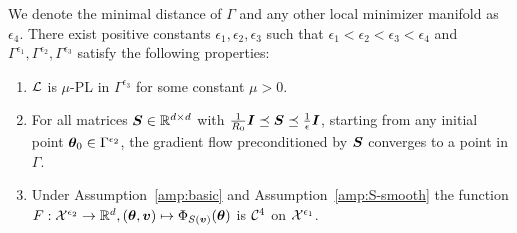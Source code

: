 \begin{lemma}\label{lem:working-zone}
We denote the minimal distance of $\Gamma$ and any other local minimizer manifold as $\epsilon_4$. There exist positive constants $\epsilon_1, \epsilon_2, \epsilon_3$ such that $\epsilon_1 < \epsilon_2 < \epsilon_3 < \epsilon_4$ and $\Gamma^{\epsilon_1}, \Gamma^{\epsilon_2},\Gamma^{\epsilon_3}$ satisfy the following properties: 
\begin{enumerate}
        \item $\mathcal{L}$ is $\mu$-PL in $\Gamma^{\epsilon_3}$ for some constant $\mu > 0$.
        \item For all matrices ${\bm{S}} \in \mathbb{R}^{d \times d}$ with $\frac{1}{R_0}{\bm{I}} \preceq {\bm{S}} \preceq \frac{1}{\epsilon}{\bm{I}}$, 
        starting from any initial point ${\bm{\theta}}_0 \in \Gamma^{\epsilon_2}$, 
        the gradient flow preconditioned by ${\bm{S}}$ converges to a point in $\Gamma$. 
        \item %
        Under Assumption~\ref{amp:basic} and Assumption~\ref{amp:S-smooth}
        the function $F: \mathcal{X}^{\epsilon_2} \to \mathbb{R}^d, ({\bm{\theta}}, {\bm{v}}) \mapsto \Phi_{S({\bm{v}})}({\bm{\theta}})$ is $\mathcal{C}^4$ on $\mathcal{X}^{\epsilon_1}$.
        
    \end{enumerate}
\end{lemma}



